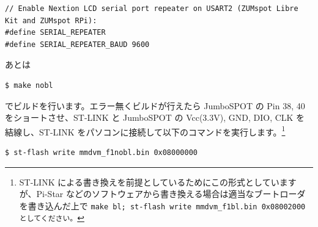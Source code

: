 \documentclass[a4j,oneside]{ujbook}
\begin{document}
\begin{verbatim}
// Enable Nextion LCD serial port repeater on USART2 (ZUMspot Libre Kit and ZUMspot RPi):
#define SERIAL_REPEATER
#define SERIAL_REPEATER_BAUD 9600
\end{verbatim}

あとは

\begin{verbatim}
$ make nobl
\end{verbatim}

でビルドを行います。エラー無くビルドが行えたら JumboSPOT の Pin 38, 40 をショートさせ、ST-LINK と JumboSPOT の Vcc(3.3V), GND, DIO, CLK を結線し、ST-LINK をパソコンに接続して以下のコマンドを実行します。\footnote{ST-LINK による書き換えを前提としているためにこの形式としていますが、Pi-Star などのソフトウェアから書き換える場合は適当なブートローダを書き込んだ上で \tt{make bl; st-flash write mmdvm\_f1bl.bin 0x08002000} としてください。}

\begin{verbatim}
$ st-flash write mmdvm_f1nobl.bin 0x08000000
\end{verbatim}
\end{document}
